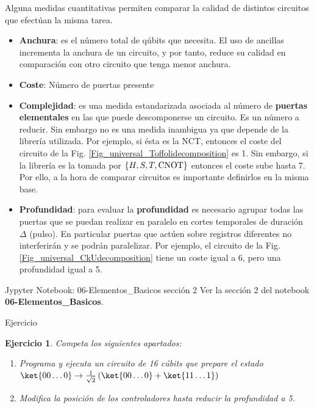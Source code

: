 \documentclass[a4paper,11pt]{book} %
\newtheorem{ejercicio_contador}{Ejercicio}
\newcommand{\Ejercicio}[1]{
		\begin{mybox_gray}{Ejercicio} 
			\begin{ejercicio_contador}
				 #1 
			\end{ejercicio_contador} 
		\end{mybox_gray}
	}
\numberwithin{equation}{chapter}
\begin{document}
Alguna medidas cuantitativas  permiten comparar la calidad de distintos circuitos que efectúan la misma tarea. 
\begin{itemize}
	\item \textbf{Anchura}: es el número total de qúbits  que necesita. El uso de ancillas incrementa la anchura de un circuito, y por tanto, reduce su calidad en comparación con otro circuito que tenga menor anchura. 
	
	\item \textbf{Coste}: Número de puertas presente
	
	\item \textbf{Complejidad}: es una medida estandarizada asociada al número de \textbf{puertas elementales} en las que puede descomponerse un circuito.  Es un número a reducir. Sin embargo no es una medida inambigua ya que depende de la librería utilizada. Por ejemplo, si ésta es la NCT, entonces el coste del circuito de la Fig. \ref{Fig_universal_Toffolidecomposition} es 1. Sin embargo, si la librería es la tomada por $ \{ H, S, T, \hbox{CNOT}\}$ entonces el coste sube hasta 7. Por ello, a la hora de comparar circuitos es importante definirlos en la misma base. 
	
	\item \textbf{Profundidad}: para evaluar la \textbf{profundidad} es necesario agrupar todas las puertas que se puedan realizar en paralelo en cortes temporales de duración $\Delta$ (pulso). En particular puertas que actúen sobre registros diferentes no interferirán y se podrán paralelizar. Por ejemplo, el circuito de la Fig. \ref{Fig_universal_CkUdecomposition} tiene un coste igual a 6, pero una profundidad igual a 5. 
\end{itemize}

	\begin{mybox_orange}{Jypyter Notebook: 06-Elementos\_Basicos sección 2}
	Ver la sección 2 del notebook \textbf{06-Elementos\_Basicos}.
	\end{mybox_orange}
	
	\Ejercicio{
		Competa los siguientes apartados:	
		\begin{enumerate} 
		\item Programa y ejecuta un circuito de 16 cúbits que prepare el estado $\ket{00\ldots 0} \to \frac{1}{\sqrt{2}}\left(\ket{00\ldots 0} + \ket{11\ldots 1}\right) $ 
		\item Modifica la posición de los controladores hasta reducir la profundidad a 5.
	\end{enumerate}
	}
\end{document}
